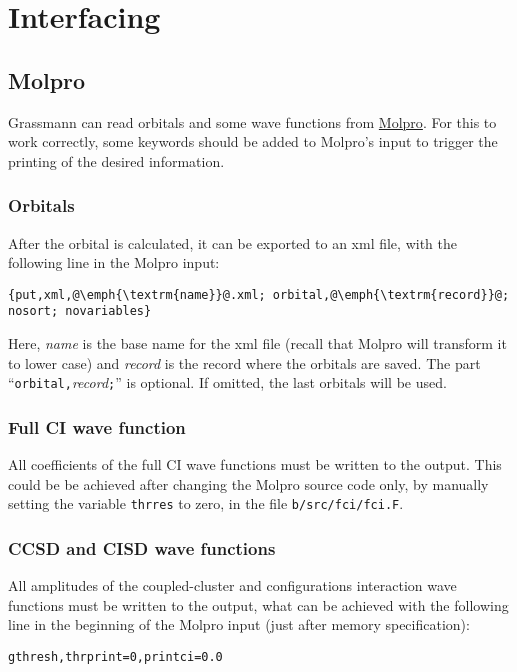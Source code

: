 \hypertarget{chap:interfacing}{}
\chapter{Interfacing}
\label{sec:interfacing}
\chapterauthor{}


\section{Molpro}

Grassmann can read orbitals and some wave functions from \href{https://www.molpro.net/}{Molpro}.
For this to work correctly, some keywords should be added to Molpro's input to trigger the printing
of the desired information.

\subsection{Orbitals}

After the orbital is calculated, it can be exported to an xml file,
with the following line in the Molpro input:
\begin{lstlisting}[style=filestyint]
{put,xml,@\emph{\textrm{name}}@.xml; orbital,@\emph{\textrm{record}}@; nosort; novariables}
\end{lstlisting}
Here, \emph{name} is the base name for the xml file
(recall that Molpro will transform it to lower case)
and \emph{record} is the record where the orbitals are saved.
The part ``\verb+orbital,+\emph{record}\verb+;+'' is optional.
If omitted, the last orbitals will be used.


\subsection{Full CI wave function}

All coefficients of the full CI wave functions must be written to the output.
This could be be achieved after changing the Molpro source code only,
by manually setting the variable \verb+thrres+ to zero, in the file \verb+b/src/fci/fci.F+.


\subsection{CCSD and CISD wave functions}

All amplitudes of the coupled-cluster and configurations interaction wave functions must be written
to the output, what can be achieved with the following line in the beginning of the Molpro input
(just after memory specification):
\begin{lstlisting}[style=filestyint]
gthresh,thrprint=0,printci=0.0
\end{lstlisting}

